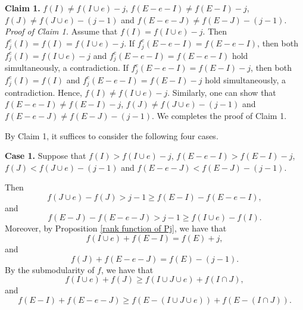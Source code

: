 \documentclass[preprint,10pt]{elsarticle}
\theoremstyle{plain}
\theoremstyle{definition}
\theoremstyle{remark}
\begin{document}
\vskip0.2cm
\noindent\textbf{Claim 1.} \(f(I)\neq f(I\cup e)-j\), \(f(E-e-I) \neq f(E-I)-j\), \(f(J) \neq f(J\cup e)-(j-1)\) and \(f(E-e-J) \neq f(E-J)-(j-1)\).
\vskip0.2cm
\noindent\emph{Proof of Claim 1.}
Assume that \(f(I)= f(I\cup e)-j\). Then \(f_{j}^e(I)=f(I)= f(I\cup e)-j\).  If \(f_{j}^e(E-e-I)=f(E-e-I)\), then  both \(f_{j}^e(I)= f(I\cup e)-j\) and \(f_{j}^e(E-e-I)=f(E-e-I)\) hold simultaneously, a contradiction. If \(f_{j}^e(E-e-I)= f(E-I)-j\), then both  \(f_{j}^e(I)= f(I)\) and \(f_{j}^e(E-e-I)= f(E-I)-j\) hold simultaneously, a contradiction. Hence, \(f(I)\neq f(I\cup e)-j\). Similarly, one can show that \(f(E-e-I) \neq f(E-I)-j\), \(f(J) \neq f(J\cup e)-(j-1)\) and \(f(E-e-J) \neq f(E-J)-(j-1)\). We completes the proof of Claim 1.
 \vskip0.2cm


By Claim 1, it suffices to consider the following four cases.

\noindent\textbf{Case 1.} Suppose that \(f(I)> f(I\cup e)-j\), \(f(E-e-I) > f(E-I)-j\), \(f(J) < f(J\cup e)-(j-1)\) and \(f(E-e-J) < f(E-J)-(j-1)\).

\vskip0.2cm
Then \begin{equation}\label{I2}
 f(J\cup e)-f(J)>j-1\geq f(E-I)-f(E-e-I),
 \end{equation}
 and
 \begin{equation}\label{I1}
f(E-J)-f(E-e-J)>j-1\geq  f(I\cup e)-f(I).
\end{equation}
Moreover,
by Proposition \ref{rank function of Pj}, we have that
\begin{equation}\label{I}
f(I\cup e) + f(E-I) = f(E)+j,
\end{equation}
and
\begin{equation}\label{J-1}
f(J) + f(E-e-J) = f(E)-(j-1).
\end{equation}
By the submodularity of $f$, we have that
\begin{equation}\label{IJe}
f(I\cup e)+f(J) \geq f(I \cup J\cup e) + f(I \cap J),
\end{equation}
and
\begin{equation}\label{IJ}
f(E-I) + f(E-e-J) \geq f(E-(I \cup J\cup e)) + f(E-(I \cap J)).
\end{equation}
\end{document}
